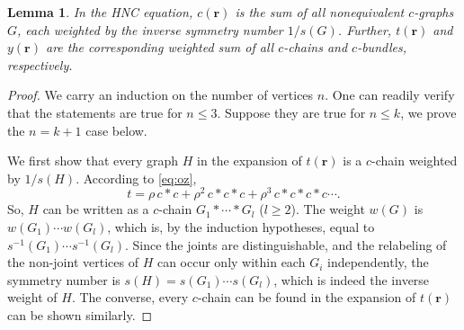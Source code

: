 \documentclass[preprint]{revtex4-1}
\newtheorem{lemm}[thrm]{Lemma}
\newcommand{\vct}[1]{\mathbf{#1}}
\providecommand{\vr}{} %
\renewcommand{\vr}{\vct{r}}
\begin{document}
\begin{lemm}
In the HNC equation,
%
$c(\vr)$
  is the sum of all nonequivalent $c$-graphs $G$,
  each weighted by the inverse symmetry number $1/s(G)$.
Further, $t(\vr)$ and $y(\vr)$ are the corresponding weighted sum of all
  $c$-chains and $c$-bundles, respectively.
  \label{thm:hnccr}
\end{lemm}
%
%
%
\begin{proof}
%
We carry an induction on the number of vertices $n$.
%
One can readily verify that the statements are true for $n \le 3$.
%
Suppose they are true for $n \le k$,
  we prove the $n = k + 1$ case below.


We first show that
  every graph $H$ in the expansion of $t(\vr)$
  is a $c$-chain weighted by $1/s(H)$.
%
According to \eqref{eq:oz},
\[
  t = \rho \, c*c + \rho^2 \, c * c * c + \rho^3 \, c*c*c*c \cdots.
\]
So, $H$ can be written as a $c$-chain
  $G_1 * \cdots * G_l$ ($l \ge 2$).
%
The weight $w(G)$ is
  $w(G_1) \cdots w(G_l)$,
  which is, by the induction hypotheses, equal to
  $s^{-1}(G_1) \cdots s^{-1}(G_l)$.
%
Since the joints are distinguishable,
  and the relabeling of the non-joint vertices  of $H$
  can occur only within each $G_i$ independently,
  the symmetry number is
  $s(H) = s(G_1) \cdots s(G_l)$,
  which is indeed the inverse weight of $H$.
%
The converse, every $c$-chain can be found in the expansion of $t(\vr)$
can be shown similarly.


\end{proof}
\end{document}
